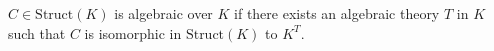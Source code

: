 $C \in \text{Struct}(K)$ is algebraic over $K$ if there exists an algebraic theory $T$ in $K$ such that $C$ is isomorphic in $\text{Struct}(K)$ to $K^T$.
